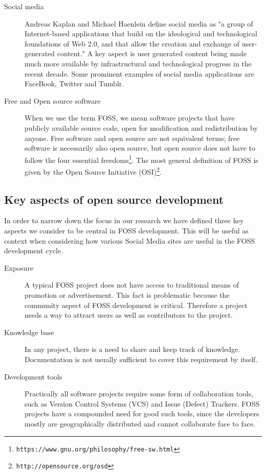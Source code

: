 \documentclass[a4paper,11pt]{article} %
\begin{document}
\begin{description}
\item[Social media] \hfill
  
  Andreas Kaplan and Michael Haenlein define social media as "a group of
  Internet-based applications that build on the ideological and
  technological foundations of Web 2.0, and that allow the creation and
  exchange of user-generated content."\cite{Kaplan201059} A key aspect is
  user generated content being made much more available by infrastructural
  and technological progress in the recent decade. Some prominent examples
  of social media applications are FaceBook, Twitter and Tumblr.

\item[Free and Open source software] \hfill

  When we use the term FOSS, we mean software projects that have publicly
  available source code, open for modification and redistribution by
  anyone\cite[.p~18,p.~57]{leister2014opensource}. Free software and open
  source are not equivalent terms; free software is necessarily also open
  source, but open source does not have to follow the four essential
  freedoms\footnote{\texttt{https://www.gnu.org/philosophy/free-sw.html}}. The
  most general definition of FOSS is given by the Open Source Initiative
  (OSI)\footnote{\texttt{http://opensource.org/osd}}.

\end{description}

\subsection{Key aspects of open source development}

In order to narrow down the focus in our research we have defined three key aspects
we consider to be central in FOSS development. This will be useful as context
when considering how various Social Media sites are useful in the FOSS development cycle.

\begin{description}
\item[Exposure] \hfill
  
  A typical FOSS project does not have access to traditional means of
  promotion or advertisement. This fact is problematic because the community
  aspect of FOSS development is critical. Therefore a project needs a way to
  attract users as well as contributors to the project.
\item[Knowledge base] \hfill

  In any project, there is a need to share and keep track of
  knowledge. Documentation is not usually sufficient to cover this
  requirement by itself.
\item[Development tools] \hfill
  
  Practically all software projects require some form of collaboration
  tools, such as Version Control Systems (VCS) and Issue (Defect)
  Trackers. FOSS projects have a compounded need for good such tools, since
  the developers mostly are geographically distributed and cannot
  collaborate face to face.
\end{description}
\end{document}
